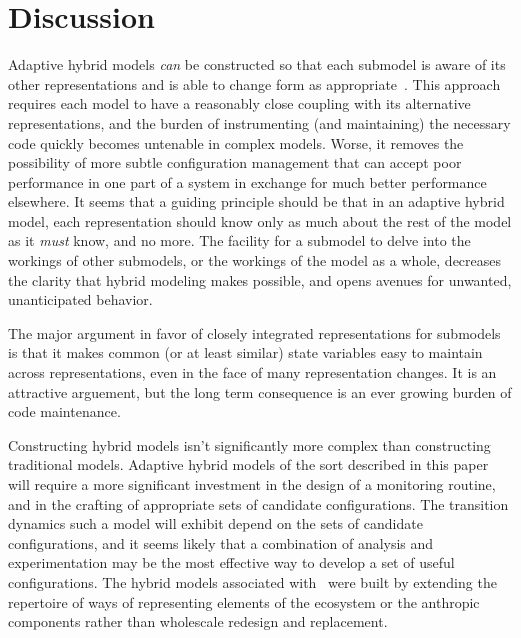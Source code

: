 \section{Discussion}

Adaptive hybrid models \emph{can} be constructed so that each
submodel is aware of its other rep\-re\-sen\-ta\-tions and is able to change
form as appropriate~\citep{Gray2012adaptive}. This approach requires each
model to have a reasonably close coupling with its alternative
rep\-re\-sen\-ta\-tions, and the burden of instrumenting (and maintaining) the
necessary code quickly becomes untenable in complex models.  Worse, it
removes the possibility of more subtle con\-fig\-ur\-a\-tion management that
can accept poor performance in one part of a system in exchange for
much better performance elsewhere.  It seems that a guiding principle
should be that in an adaptive hybrid model, each rep\-re\-sen\-ta\-tion should
know only as much about the rest of the model as it \emph{must} know,
and no more. The facility for a sub\-model to delve into the workings of
other sub\-models, or the workings of the model as a whole, decreases
the clarity that hybrid modeling makes possible, and opens avenues
for unwanted, unanticipated behavior.

The major argument in favor of closely integrated rep\-re\-sen\-ta\-tions for
sub\-models is that it makes common (or at least similar) state
variables easy to maintain across rep\-re\-sen\-ta\-tions, even in the face of
many rep\-re\-sen\-ta\-tion changes. It is an attractive arguement, but the
long term consequence is an ever growing burden of code maintenance.

Constructing hybrid models isn't significantly more complex than
constructing traditional models. Adaptive hybrid models of the sort
described in this paper will require a more significant investment in
the design of a monitoring routine, and in the crafting of appropriate
sets of candidate con\-fig\-ur\-a\-tions.  The transition dynamics such a
model will exhibit depend on the sets of candidate con\-fig\-ur\-a\-tions, and
it seems likely that a combination of analysis and experimentation may
be the most effective way to develop a set of useful con\-fig\-ur\-a\-tions.
The hybrid models associated with~\cite{Lyne1994pmez5, Little2006nws,
  Fulton2009crossingscales} were built by extending the repertoire of ways of
representing elements of the ecosystem or the anthropic components
rather than wholescale redesign and replacement.

